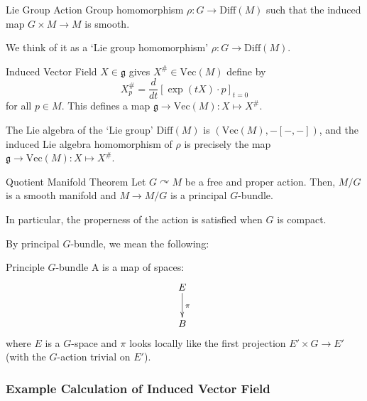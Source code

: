 \documentclass[b5paper,final]{article}
\newcommand{\Diff}{\mathrm{Diff}}
\newcommand{\acton}{\curvearrowright}
\newcommand{\vf}{\mathrm{Vec}}
\newcommand{\ind}[1]{#1^\#}
\begin{document}
\begin{definition}{Lie Group Action}
    Group homomorphism $\rho : G \to \Diff(M)$ such that the induced map $G \times M \to M$ is smooth.
    \begin{remark}
        We think of it as a `Lie group homomorphism' $\rho : G \to \Diff(M)$.
    \end{remark}
\end{definition}

\begin{definition}{Induced Vector Field}
    $X \in \mathfrak{g}$ gives $\ind{X} \in \vf(M)$ define by
    \begin{equation*}
        \ind{X}_p = \frac{d}{dt}[\exp(tX) \cdot p]_{t=0}
    \end{equation*}
    for all $p \in M$. This defines a map $\mathfrak{g} \to \vf(M) : X \mapsto \ind{X}$.
    \begin{remark}
        The Lie algebra of the `Lie group' $\Diff(M)$ is $(\vf(M), -[-, -])$, and the induced Lie algebra homomorphism of $\rho$ is precisely the map $\mathfrak{g} \to \vf(M) : X \mapsto \ind{X}$.
    \end{remark}
\end{definition}

\begin{theorem}{Quotient Manifold Theorem}
    Let $G \acton M$ be a free and proper action. Then, $M/G$ is a smooth manifold and $M \to M/G$ is a principal $G$-bundle.
    \begin{remark}
        In particular, the properness of the action is satisfied when $G$ is compact.
    \end{remark}
\end{theorem}

By principal $G$-bundle, we mean the following:

\begin{definition}[def:]{Principle $G$-bundle}
  A  is a map of spaces:
\[
  \xymatrix{E\ar[d]^\pi\\B}
\]
where $E$ is a $G$-space and $\pi$ looks locally like the first projection $E'\times G\rightarrow E'$ (with the $G$-action trivial on $E'$).
\end{definition}

\subsubsection*{Example Calculation of Induced Vector Field}
\end{document}
